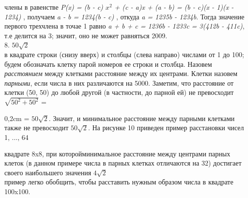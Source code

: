 \pagestyle{main}
\begin{multicols}{2}
 члены в равенстве\newline
\textsl{P(x) = (b - c) $x^2$ + (c - a)x + (a - b) = (b - c)(x - 1)(x - 1234)} , получаем \textsl{a - b = 1234(b - c)} , откуда \textsl{a = 1235b - 1234b}. Тогда значение первого трехчлена в точае 1 равно \textsl{a + b + c = 1236b - 1233c = 3(412b - 411c)}, т.е делится на 3; значит, оно не может равняться 2009.\\
8. $50\sqrt{2}$\\
 в квадрате строки (снизу вверх) и столбцы (слева направо) числами от 1 до 100; будем обозначать клетку парой номеров ее строки и столбца. Назовем \textsl{расстоянием} между клетками расстояние между их центрами. Клетки назовем \textsl{парными}, если числа в них различаются на 5000. Заметим, что расстояние от клетки (50, 50) до любой другой (в частности, до парной ей) не превосходит $\sqrt{50^2 + 50^2}$ =
\vspace{-0,5\baselineskip}
\begin{multicols}{2}
\begin{minipage}{\linewidth}
\centering
{}
\end{minipage}

\vfill\null
\columnbreak

\begin{adjustwidth}{0,2cm}{}
= $50\sqrt{2}$. Значит, и минимальное расстояние между парными клетками также не превосходит $50\sqrt{2}$. На рисунке 10 приведен пример расстановки чисел 1, ..., 64
\end{adjustwidth}
\end{multicols}
\vspace{-0,5\baselineskip}
 квадрате 8x8, при которойминимальное расстояние между центрами парных клеток (в данном примере числа в парных клетках отличаются на 32) достигает своего наибольшего значения $4\sqrt{2}$\\
 пример легко обобщить, чтобы расставить нужным образом числа в квадрате 100x100.


\end{multicols}
